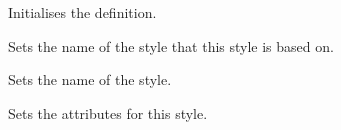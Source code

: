Initialises the definition.

\label{wxrichtextstyledefinitionsetbasestyle}


Sets the name of the style that this style is based on.

\label{wxrichtextstyledefinitionsetname}


Sets the name of the style.

\label{wxrichtextstyledefinitionsetstyle}


Sets the attributes for this style.

